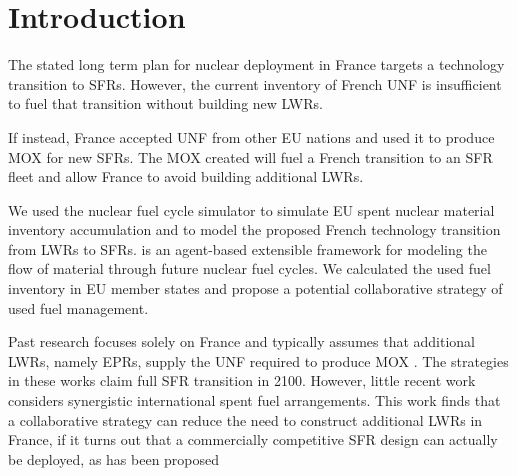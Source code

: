 
\section{Introduction}
The stated long term plan for nuclear deployment in France targets a technology 
transition to \glspl{SFR}\cite{cne2_reports_2015}. However, the current inventory of French \gls{UNF} 
is insufficient to fuel that transition without building new \glspl{LWR}.

If instead, France accepted 
\gls{UNF} from other \gls{EU} nations and used it to produce \gls{MOX} for new \glspl{SFR}.
The \gls{MOX} created will fuel a French transition to an \gls{SFR} fleet
and allow France to avoid building additional \glspl{LWR}.


We used the \Cyclus nuclear fuel cycle simulator \cite{huff_fundamental_2016} to simulate
 \gls{EU} spent nuclear material inventory accumulation and to model the 
 proposed French 
 technology transition from \glspl{LWR} to
 \glspl{SFR}. \Cyclus is an agent-based extensible
framework for modeling the flow of material through future nuclear fuel cycles.
We calculated the used fuel
inventory in \gls{EU} member states and propose a potential collaborative
strategy of used fuel management.


Past research focuses solely on France and typically assumes that additional \glspl{LWR},
namely \glspl{EPR}, supply the \gls{UNF} required to produce \gls{MOX} \cite{carre_overview_2009, martin_symbiotic_2017, freynet_multiobjective_2016}. The strategies in these works claim
full \gls{SFR} transition in 2100.
However, little recent work considers synergistic international spent fuel arrangements.
This work finds that a collaborative strategy can reduce the
need to construct additional \glspl{LWR} in France, if it turns
out that a commercially competitive \gls{SFR} design can actually be
deployed, as has been proposed \cite{zhao_improving_2009}
